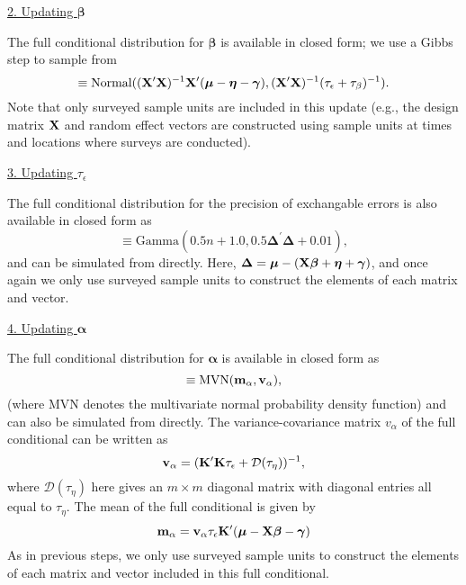 \documentclass[12pt,fleqn]{article}
\begin{document}
\begin{flushleft}
\underline{2. Updating $\boldsymbol{\beta}$}

The full conditional distribution for $\boldsymbol{\beta}$ is available in closed form; we use a Gibbs step to sample from
\begin{equation*}
  [\boldsymbol{\beta} | \cdot] \equiv \textrm{Normal}(({\bf X}^\prime {\bf X})^{-1}{\bf X}^\prime (\boldsymbol{\mu} - \boldsymbol{\eta} - \boldsymbol{\gamma}),({\bf X}^\prime {\bf X})^{-1} (\tau_\epsilon + \tau_\beta)^{-1}).
\end{equation*}
Note that only surveyed sample units are included in this update (e.g., the design matrix ${\bf X}$ and random effect vectors are constructed using sample units at times and locations where surveys are conducted).

\underline{3. Updating $\tau_\epsilon$}

The full conditional distribution for the precision of exchangable errors is also available in closed form as
\begin{equation*}
  [\tau_\epsilon | \cdot] \equiv \textrm{Gamma}(0.5n + 1.0,0.5 \boldsymbol{\Delta}^\prime \boldsymbol{\Delta} + 0.01),
\end{equation*}
and can be simulated from directly.
 Here, $\boldsymbol{\Delta} = \boldsymbol{\mu}- ({\bf X} \boldsymbol{\beta} + \boldsymbol{\eta} + \boldsymbol{\gamma})$, and once again we only use surveyed sample units to construct the elements of each matrix and vector.

\underline{4. Updating $\boldsymbol{\alpha}$}

The full conditional distribution for $\boldsymbol{\alpha}$ is available in closed form as
\begin{equation*}
  [\boldsymbol{\alpha} | \cdot] \equiv \textrm{MVN}({\bf m}_{\alpha},{\bf v}_{\alpha}),
\end{equation*}
(where MVN denotes the multivariate normal probability density function) and can also be simulated from directly.  The variance-covariance matrix $v_{\alpha}$ of the full conditional can be written as
\begin{equation*}
  {\bf v}_{\alpha} = ({\bf K}^{\prime}{\bf K} \tau_\epsilon + \mathcal{D}(\tau_\eta))^{-1},
\end{equation*}
where $\mathcal{D}(\tau_\eta)$ here gives an $m \times m$ diagonal matrix with diagonal entries all equal to $\tau_\eta$.  The mean of the full conditional is given by
\begin{equation*}
  {\bf m}_{\alpha} = {\bf v}_\alpha \tau_\epsilon {\bf K}^\prime (\boldsymbol{\mu}- {\bf X} \boldsymbol{\beta} - \boldsymbol{\gamma})
\end{equation*}
As in previous steps, we only use surveyed sample units to construct the elements of each matrix and vector included in this full conditional.


\end{flushleft}
\end{document}
